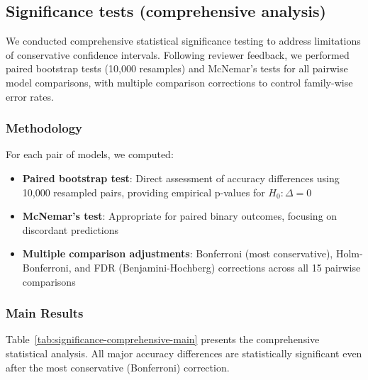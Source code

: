 
\subsection{Significance tests (comprehensive analysis)}
\label{app:significance}

We conducted comprehensive statistical significance testing to address limitations of conservative confidence intervals. Following reviewer feedback, we performed paired bootstrap tests (10,000 resamples) and McNemar's tests for all pairwise model comparisons, with multiple comparison corrections to control family-wise error rates.

\subsubsection{Methodology}

For each pair of models, we computed:
\begin{itemize}
    \item \textbf{Paired bootstrap test}: Direct assessment of accuracy differences using 10,000 resampled pairs, providing empirical p-values for $H_0: \Delta = 0$
    \item \textbf{McNemar's test}: Appropriate for paired binary outcomes, focusing on discordant predictions
    \item \textbf{Multiple comparison adjustments}: Bonferroni (most conservative), Holm-Bonferroni, and FDR (Benjamini-Hochberg) corrections across all 15 pairwise comparisons
\end{itemize}

\subsubsection{Main Results}

Table~\ref{tab:significance-comprehensive-main} presents the comprehensive statistical analysis. All major accuracy differences are statistically significant even after the most conservative (Bonferroni) correction.

